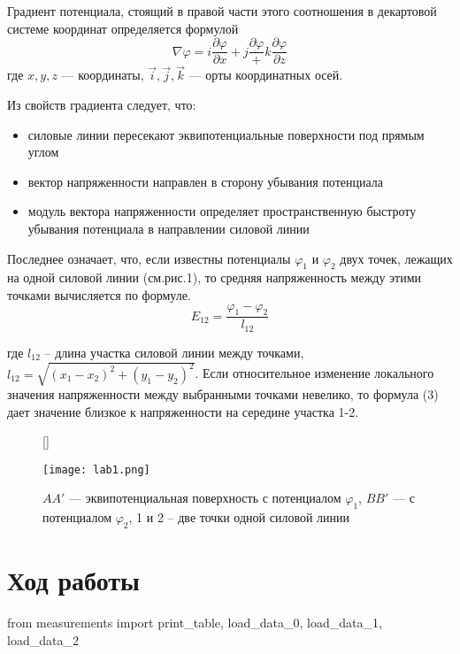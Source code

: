 \documentclass[12pt, a4paper]{article}
\begin{document}
Градиент потенциала, стоящий в правой части этого соотношения в декартовой
системе координат определяется формулой
\begin{equation}
\nabla\varphi = i \frac{\partial\varphi}{\partial x} + j \frac{\partial\varphi}
+ k \frac{\partial\varphi}{\partial z}
\end{equation}
где $x,y,z$ — координаты, $\vec{i}, \vec{j}, \vec{k}$ — орты координатных осей.

Из свойств градиента следует, что:
\begin{itemize}
\item силовые линии пересекают эквипотенциальные поверхности под прямым углом
\item вектор напряженности направлен в сторону убывания потенциала
\item модуль вектора напряженности определяет пространственную быстроту
убывания потенциала в направлении силовой линии
\end{itemize}

Последнее означает, что, если известны потенциалы $\varphi_1$ и $\varphi_2$
двух точек, лежащих на одной силовой линии (см.рис.1), то средняя напряженность
между этими точками вычисляется по формуле.
\begin{equation} \label{eq:potdiff}
E_{12} = \frac{\varphi_1 - \varphi_2}{l_{12}}
\end{equation}

где $l_{12}$ – длина участка силовой линии между точками,
$l_{12} = \sqrt{(x_1 - x_2)^2 + (y_1 - y_2)^2}$. Если относительное
изменение локального значения напряженности между выбранными точками
невелико, то формула (3) дает значение близкое к напряженности на середине
участка 1-2.

\begin{figure}[H]
[\FBwidth]
{\caption{$AA'$ — эквипотенциальная поверхность с потенциалом $\varphi_1$,
$BB'$ — с потенциалом $\varphi_2$, 1 и 2 – две точки одной силовой линии}}
{\texttt{[image: lab1.png]}}
\end{figure}

\newpage
\section*{Ход работы}

\begin{pycode}
from measurements import print_table, load_data_0, load_data_1, load_data_2
\end{pycode}
\end{document}

